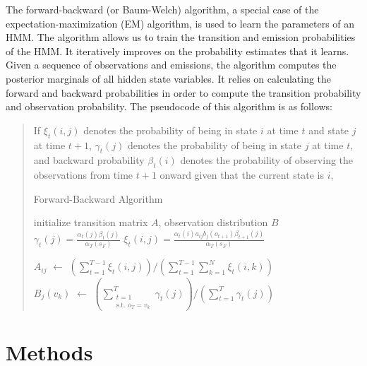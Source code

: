 \documentclass{article}
\begin{document}
The forward-backward (or Baum-Welch) algorithm, a special case of the expectation-maximization (EM) algorithm, is used to learn the parameters of an HMM. The algorithm allows us to train the transition and emission probabilities of the HMM. It iteratively improves on the probability estimates that it learns. Given a sequence of observations and emissions, the algorithm computes the posterior marginals of all hidden state variables. It relies on calculating the forward and backward probabilities in order to compute the transition probability and observation probability. The pseudocode of this algorithm is as follows:

\begin{quote}
If $\xi_t(i, j)$ denotes the probability of being in state $i$ at time $t$ and state $j$ at time $t + 1$, $\gamma_t(j)$ denotes the probability of being in state $j$ at time $t$, and backward probability $\beta_t(i)$ denotes the probability of observing the observations from time $t + 1$ onward given that the current state is $i$,
\begin{algorithm}
\caption{Forward-Backward Algorithm}
\begin{algorithmic}
    \State initialize transition matrix $A$, observation distribution $B$
    \Repeat
            $\displaystyle \gamma_t(j) = \frac{\alpha_t(j) \beta_t(j)} {\alpha_T(s_F)}$
        \EndFor
            $\displaystyle \xi_t(i, j) = \frac{\alpha_t(i) a_{ij} b_j(o_{t + 1}) \beta_{t + 1}(j)} {\alpha_T(s_F)}$
        \EndFor
        
        \State $A_{ij}$ $\gets$ 
        $\displaystyle \left(\sum\limits_{t = 1}^{T - 1} \xi_t(i, j)\right) / \left(\sum\limits_{t = 1}^{T - 1} \sum\limits_{k = 1}^{N} \xi_t(i, k)\right)$
        \\
        \State $B_{j}(v_k)$ $\gets$
        $\displaystyle \left(\sum\limits_{\substack{t = 1 \\ \text{s.t. } o_T = v_k}}^{T} \gamma_t(j)\right) / \left(\sum\limits_{t = 1}^{T} \gamma_t(j)\right)$
        \\
    \EndProcedure
\end{algorithmic}
\end{algorithm}
\end{quote}

\section{Methods}
\end{document}
